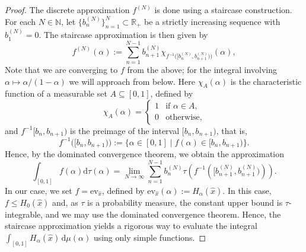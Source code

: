 \documentclass[aps,pra,11pt,onecolumn,nofootinbib,tightenlines]{revtex4-2}
\theoremstyle{definition}
\def \d {\mathrm{d}}
\begin{document}
\begin{proof}
The discrete approximation $f^{(N)}$ is done using a staircase construction.
For each $N \in \mathbb{N}$, let $\{b_n^{(N)}\}_{n=1}^N \subset \mathbb{R}_+$ be a strictly increasing sequence with $b_1^{(N)} = 0$.
The staircase approximation is then given by
\begin{equation}
f^{(N)}(\alpha) := \sum_{n=1}^{N-1} b_{n+1}^{(N)}  \chi_{f^{-1}\big ([b_n^{(N)}, b_{n+1}^{(N)})\big)}(\alpha),
\end{equation}
Note that we are converging to $f$ from the above; for the integral involving $\alpha\mapsto\alpha/(1-\alpha)$ we will approach from below. Here $\chi_A(\alpha)$ is the characteristic function of a measurable set $A \subseteq [0,1]$, defined by
\begin{equation}
    \chi_A(\alpha) = 
  \begin{cases}
  1 & \text{if } \alpha \in A, \\
  0 & \text{otherwise,}
  \end{cases}
\end{equation}
 and $f^{-1}[b_n, b_{n+1})$ is the preimage of the interval $[b_n, b_{n+1})$, that is,
 \begin{equation}
     f^{-1}\big([b_n, b_{n+1})\big) := \{\alpha \in [0,1] \mid f(\alpha) \in [b_n, b_{n+1}) \}.
 \end{equation}
Hence, by the dominated convergence theorem, we obtain the approximation
\begin{equation}
\int_{[0,1]} f(\alpha) \d\tau(\alpha) = \lim_{N \to \infty} \sum_{n=1}^{N-1} b_n^{(N)}  \tau\left(f^{-1}\left([b_{n+1}^{(N)}, b_{n+1}^{(N)})\right)\right).
\end{equation}
In our case, we set $f = \mathrm{ev}_{\hat{x}}$, defined by $\mathrm{ev}_{\hat{x}}(\alpha) := H_\alpha(\hat{x})$. In this case, $f\leq H_0(\hat{x})$ and, as $\tau$ is a probability measure, the constant upper bound is $\tau$-integrable, and we may use the dominated convergence theorem.
Hence, the staircase approximation yields a rigorous way to evaluate the integral $\int_{[0,1]} H_\alpha(\hat{x}) \,\d\mu(\alpha)$ using only simple functions.%


\end{proof}
\end{document}
